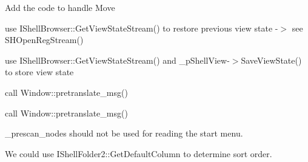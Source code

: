\begin{DoxyRefList}
Add the code to handle Move  
\item[\label{todo__todo000013}%
\Hypertarget{todo__todo000013}%
成员 \hyperlink{struct_desktop_shell_view_a8899b937d203213479596725802692ac}{Desktop\+Shell\+View\+:\+:Position\+Icons} (int dir=1)]
\item[\label{todo__todo000014}%
\Hypertarget{todo__todo000014}%
成员 \hyperlink{struct_desktop_shell_view_a4d66e2c55895559db066f9c21de699c0}{Desktop\+Shell\+View\+:\+:refresh} ()]
\item[\label{todo__todo000011}%
\Hypertarget{todo__todo000011}%
成员 \hyperlink{struct_desktop_window_a4733a9617d8acbcc3e64ca8edb2a6b30}{Desktop\+Window\+:\+:Init} (L\+P\+C\+R\+E\+A\+T\+E\+S\+T\+R\+U\+CT pcs)]use I\+Shell\+Browser\+::\+Get\+View\+State\+Stream() to restore previous view state -\/$>$ see S\+H\+Open\+Reg\+Stream()  
\item[\label{todo__todo000012}%
\Hypertarget{todo__todo000012}%
成员 \hyperlink{struct_desktop_window_aef29a0eb3bfc089a83ad8627c2ecadaf}{Desktop\+Window\+:\+:Wnd\+Proc} (U\+I\+NT nmsg, W\+P\+A\+R\+AM wparam, L\+P\+A\+R\+AM lparam)]use I\+Shell\+Browser\+::\+Get\+View\+State\+Stream() and \+\_\+p\+Shell\+View-\/$>$Save\+View\+State() to store view state  
\item[\label{todo__todo000086}%
\Hypertarget{todo__todo000086}%
成员 \hyperlink{struct_dialog_a70b9e81d26f712c4079ae96c9009edbb}{Dialog\+:\+:Do\+Modal} (U\+I\+NT nid, C\+R\+E\+A\+T\+O\+R\+F\+U\+N\+C\+\_\+\+I\+N\+FO creator, const void $\ast$info, H\+W\+ND hwnd\+Parent=0)]call Window\+::pretranslate\+\_\+msg()  
\item[\label{todo__todo000085}%
\Hypertarget{todo__todo000085}%
成员 \hyperlink{struct_dialog_a68e10e3226c95864b8570595adc6a39c}{Dialog\+:\+:Do\+Modal} (U\+I\+NT nid, C\+R\+E\+A\+T\+O\+R\+F\+U\+NC creator, H\+W\+ND hwnd\+Parent=0)]call Window\+::pretranslate\+\_\+msg()  
\item[\label{todo__todo000025}%
\Hypertarget{todo__todo000025}%
成员 \hyperlink{struct_entry_a60b0ecb89c8f4d79f5401b892b3ac190}{Entry\+:\+:read\+\_\+directory\+\_\+base} (S\+O\+R\+T\+\_\+\+O\+R\+D\+ER sort\+Order=S\+O\+R\+T\+\_\+\+N\+A\+ME, int scan\+\_\+flags=0)]\+\_\+prescan\+\_\+nodes should not be used for reading the start menu.  
\item[\label{todo__todo000026}%
\Hypertarget{todo__todo000026}%
成员 \hyperlink{struct_entry_ac7af5ff20fa83e4962caf8e59e1ee437}{Entry\+:\+:smart\+\_\+scan} (S\+O\+R\+T\+\_\+\+O\+R\+D\+ER sort\+Order=S\+O\+R\+T\+\_\+\+N\+A\+ME, int scan\+\_\+flags=0)]We could use I\+Shell\+Folder2\+::\+Get\+Default\+Column to determine sort order.  

\end{DoxyRefList}
